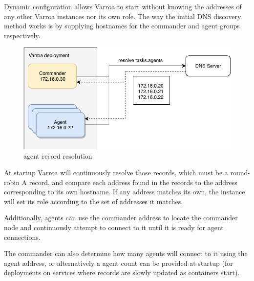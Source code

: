 Dynamic configuration allows Varroa to start without knowing the addresses of any other Varroa instances nor its own role. The way the initial DNS discovery method works is by supplying hostnames for the commander and agent groups respectively.


\begin{figure}[h]
\begin{center}
\includegraphics[scale=0.65]{Resources/PDF/ExecutionDnsDiscovery}
\caption{agent record resolution}
\end{center}
\end{figure}

At startup Varroa will continuously resolve those records, which must be a round-robin A record, and compare each address found in the records to the address corresponding to its own hostname. If any address matches its own, the instance will set its role according to the set of addresses it matches.

Additionally, agents can use the commander address to locate the commander node and continuously attempt to connect to it until it is ready for agent connections.

The commander can also determine how many agents will connect to it using the agent address, or alternatively a agent count can be  provided at startup (for deployments on services where records are slowly updated as containers start).